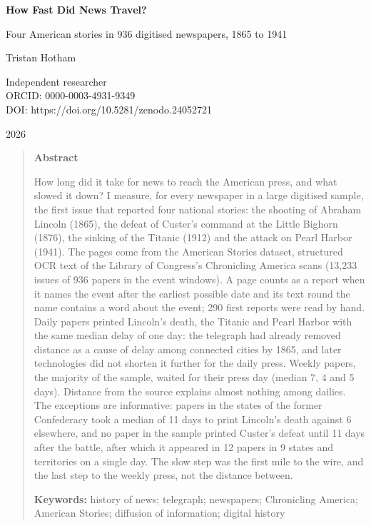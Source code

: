 \documentclass[11pt,a4paper]{article}
\begin{document}
\begin{center}
{\Large\bfseries How Fast Did News Travel?\par}
\vspace{0.4em}
{\large Four American stories in 936 digitised newspapers, 1865 to 1941\par}
\vspace{1.2em}
{\large Tristan Hotham\par}
\vspace{0.3em}
{\small Independent researcher\\
ORCID: 0000-0003-4931-9349\\
DOI: https://doi.org/10.5281/zenodo.24052721\par}
\vspace{0.8em}
2026
\end{center}

\begin{quote}
\small
\begin{center}\textbf{Abstract}\end{center}
How long did it take for news to reach the American press, and what slowed it down? I measure, for every newspaper in a large digitised sample, the first issue that reported four national stories: the shooting of Abraham Lincoln (1865), the defeat of Custer's command at the Little Bighorn (1876), the sinking of the Titanic (1912) and the attack on Pearl Harbor (1941). The pages come from the American Stories dataset, structured OCR text of the Library of Congress's Chronicling America scans (13,233 issues of 936 papers in the event windows). A page counts as a report when it names the event after the earliest possible date and its text round the name contains a word about the event; 290 first reports were read by hand. Daily papers printed Lincoln's death, the Titanic and Pearl Harbor with the same median delay of one day: the telegraph had already removed distance as a cause of delay among connected cities by 1865, and later technologies did not shorten it further for the daily press. Weekly papers, the majority of the sample, waited for their press day (median 7, 4 and 5 days). Distance from the source explains almost nothing among dailies. The exceptions are informative: papers in the states of the former Confederacy took a median of 11 days to print Lincoln's death against 6 elsewhere, and no paper in the sample printed Custer's defeat until 11 days after the battle, after which it appeared in 12 papers in 9 states and territories on a single day. The slow step was the first mile to the wire, and the last step to the weekly press, not the distance between.

\textbf{Keywords:} history of news; telegraph; newspapers; Chronicling America; American Stories; diffusion of information; digital history
\end{quote}
\end{document}
